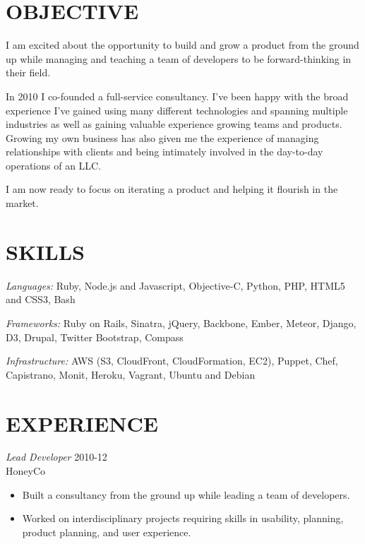 \documentclass[line,margin]{res}
\begin{document}
\address{q.shanahan@gmail.com}
\address{(641) 233-1123}


\begin{resume}

\section{OBJECTIVE}

    I am excited about the opportunity to build and grow a product from the
    ground up while managing and teaching a team of developers to be
    forward-thinking in their field.

    In 2010 I co-founded a full-service consultancy. I've been happy with the
    broad experience I've gained using many different technologies and
    spanning multiple industries as well as gaining valuable experience
    growing teams and products. Growing my own business has also given me the
    experience of managing relationships with clients and being intimately
    involved in the day-to-day operations of an LLC.

    I am now ready to focus on iterating a product and helping it flourish in
    the market.

\section{SKILLS}
    {\sl Languages:}
        Ruby, Node.js and Javascript,
        Objective-C, Python, PHP, HTML5 and CSS3, Bash

    {\sl Frameworks:}
        Ruby on Rails, Sinatra, jQuery, Backbone, Ember, Meteor,
        Django, D3, Drupal, Twitter Bootstrap, Compass

    {\sl Infrastructure:}
        AWS (S3, CloudFront, CloudFormation, EC2), Puppet,
        Chef, Capistrano, Monit, Heroku, Vagrant, Ubuntu and Debian

\section{EXPERIENCE}
    {\sl Lead Developer}
    \hfill 2010-12 \\
    HoneyCo
    \begin{itemize} \itemsep -2pt
        \item
            Built a consultancy from the ground up while leading
            a team of developers.

        \item
            Worked on interdisciplinary projects requiring skills in
            usability, planning, product planning, and user experience.


\end{itemize}
\end{resume}
\end{document}
